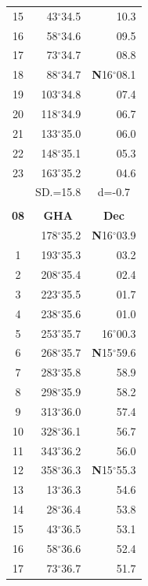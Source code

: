 \documentclass[10pt, a4paper]{report}
\begin{document}
\begin{scriptsize}
\begin{tabular*}{0.2\textwidth}[t]{@{\extracolsep{\fill}}|c|rr|}
15 & 43$^\circ$34.5 & \raisebox{0.24ex}{\boldmath$\cdot$~\boldmath$\cdot$~~}10.3\\
16 & 58$^\circ$34.6 & 09.5\\
17 & 73$^\circ$34.7 & 08.8\\[2Pt]
18 & 88$^\circ$34.7 & \textbf{N}16$^\circ$08.1\\
19 & 103$^\circ$34.8 & 07.4\\
20 & 118$^\circ$34.9 & 06.7\\
21 & 133$^\circ$35.0 & \raisebox{0.24ex}{\boldmath$\cdot$~\boldmath$\cdot$~~}06.0\\
22 & 148$^\circ$35.1 & 05.3\\
23 & 163$^\circ$35.2 & 04.6\\
\hline
\rule{0pt}{2.4ex} & \multicolumn{1}{c}{SD.=15.8} & \multicolumn{1}{c|}{d=-0.7}\\
\hline
\multicolumn{1}{c}{}\\[-0.5ex]\hline
\multicolumn{1}{|c|}{\rule{0pt}{2.6ex}\textbf{08}} & \multicolumn{1}{c}{\textbf{GHA}} & \multicolumn{1}{c|}{\textbf{Dec}}\\
\hline\rule{0pt}{2.6ex}\noindent
0 & 178$^\circ$35.2 & \textbf{N}16$^\circ$03.9\\
1 & 193$^\circ$35.3 & 03.2\\
2 & 208$^\circ$35.4 & 02.4\\
3 & 223$^\circ$35.5 & \raisebox{0.24ex}{\boldmath$\cdot$~\boldmath$\cdot$~~}01.7\\
4 & 238$^\circ$35.6 & 01.0\\
5 & 253$^\circ$35.7 & 16$^\circ$00.3\\[2Pt]
6 & 268$^\circ$35.7 & \textbf{N}15$^\circ$59.6\\
7 & 283$^\circ$35.8 & 58.9\\
8 & 298$^\circ$35.9 & 58.2\\
9 & 313$^\circ$36.0 & \raisebox{0.24ex}{\boldmath$\cdot$~\boldmath$\cdot$~~}57.4\\
10 & 328$^\circ$36.1 & 56.7\\
11 & 343$^\circ$36.2 & 56.0\\[2Pt]
12 & 358$^\circ$36.3 & \textbf{N}15$^\circ$55.3\\
13 & 13$^\circ$36.3 & 54.6\\
14 & 28$^\circ$36.4 & 53.8\\
15 & 43$^\circ$36.5 & \raisebox{0.24ex}{\boldmath$\cdot$~\boldmath$\cdot$~~}53.1\\
16 & 58$^\circ$36.6 & 52.4\\
17 & 73$^\circ$36.7 & 51.7\\[2Pt]

\end{tabular*}
\end{scriptsize}
\end{document}
